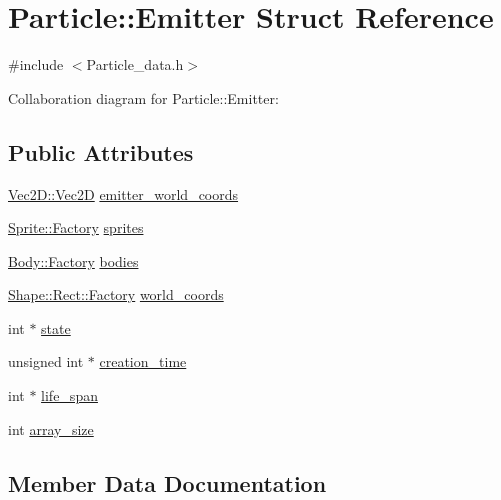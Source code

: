 \hypertarget{struct_particle_1_1_emitter}{}\section{Particle\+:\+:Emitter Struct Reference}
\label{struct_particle_1_1_emitter}


{\ttfamily \#include $<$Particle\+\_\+data.\+h$>$}



Collaboration diagram for Particle\+:\+:Emitter\+:
\subsection*{Public Attributes}
\begin{DoxyCompactItemize}
\item 
\mbox{\hyperlink{struct_vec2_d_1_1_vec2_d}{Vec2\+D\+::\+Vec2D}} \mbox{\hyperlink{struct_particle_1_1_emitter_a7b0748841b7bcd9de84ae7b849378444}{emitter\+\_\+world\+\_\+coords}}
\item 
\mbox{\hyperlink{struct_sprite_1_1_factory}{Sprite\+::\+Factory}} \mbox{\hyperlink{struct_particle_1_1_emitter_ab0e080daafa54b6a8efd11c9f61c38a9}{sprites}}
\item 
\mbox{\hyperlink{struct_body_1_1_factory}{Body\+::\+Factory}} \mbox{\hyperlink{struct_particle_1_1_emitter_a0f7c4ccf9c7a8de9f0809eeeac7bdda2}{bodies}}
\item 
\mbox{\hyperlink{struct_shape_1_1_rect_1_1_factory}{Shape\+::\+Rect\+::\+Factory}} \mbox{\hyperlink{struct_particle_1_1_emitter_a1bd409e916c09c0c07fb1d4b812eb040}{world\+\_\+coords}}
\item 
int $\ast$ \mbox{\hyperlink{struct_particle_1_1_emitter_a261cfd3f38c02b2aaaf4f7cd04c9ff08}{state}}
\item 
unsigned int $\ast$ \mbox{\hyperlink{struct_particle_1_1_emitter_a903e8f4346c476dcbe3e5026d55ab44c}{creation\+\_\+time}}
\item 
int $\ast$ \mbox{\hyperlink{struct_particle_1_1_emitter_a0733b15f22567f758fefc341b34e214c}{life\+\_\+span}}
\item 
int \mbox{\hyperlink{struct_particle_1_1_emitter_a3ed9d9288d07b94d59d72306c4646d8c}{array\+\_\+size}}
\end{DoxyCompactItemize}


\subsection{Member Data Documentation}
\mbox{\label{struct_particle_1_1_emitter_a3ed9d9288d07b94d59d72306c4646d8c}} 
